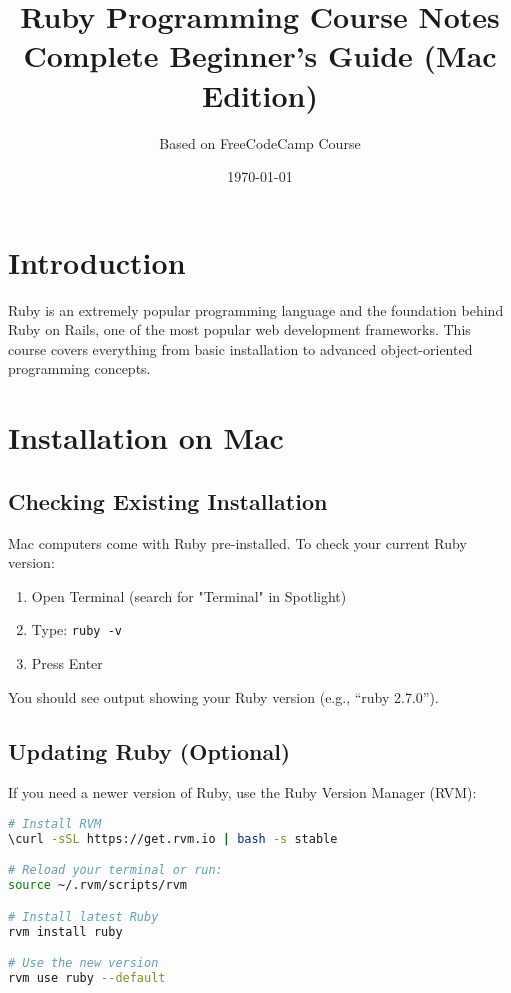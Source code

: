 \documentclass[12pt,a4paper]{article}
\title{\textbf{Ruby Programming Course Notes}\\
\large Complete Beginner's Guide (Mac Edition)}
\author{Based on FreeCodeCamp Course}
\date{\today}
\begin{document}
\maketitle
\tableofcontents
\newpage

\section{Introduction}

Ruby is an extremely popular programming language and the foundation behind Ruby on Rails, one of the most popular web development frameworks. This course covers everything from basic installation to advanced object-oriented programming concepts.

\section{Installation on Mac}

\subsection{Checking Existing Installation}
Mac computers come with Ruby pre-installed. To check your current Ruby version:

\begin{enumerate}
    \item Open Terminal (search for "Terminal" in Spotlight)
    \item Type: \texttt{ruby -v}
    \item Press Enter
\end{enumerate}

You should see output showing your Ruby version (e.g., ``ruby 2.7.0'').

\subsection{Updating Ruby (Optional)}
If you need a newer version of Ruby, use the Ruby Version Manager (RVM):

\begin{lstlisting}[language=bash]
# Install RVM
\curl -sSL https://get.rvm.io | bash -s stable

# Reload your terminal or run:
source ~/.rvm/scripts/rvm

# Install latest Ruby
rvm install ruby

# Use the new version
rvm use ruby --default
\end{lstlisting}
\end{document}
